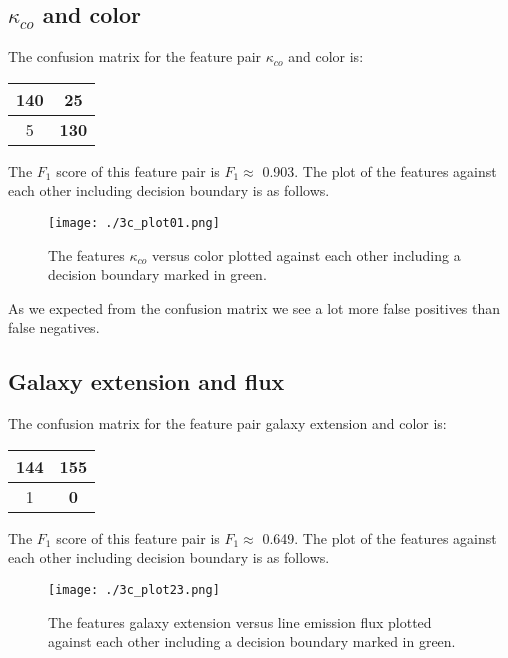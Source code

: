 \subsection*{$\kappa_{co}$ and color}

The confusion matrix for the feature pair $\kappa_{co}$ and color is:

\begin{table}[!h]
\centering
\begin{tabular}{c|c}
\textbf{140} & 25\\ \hline
5 &   \textbf{130}\\
\end{tabular}
\end{table}

The $F_1$ score of this feature pair is $F_1 \approx$ 0.903. The plot of the features against each other including decision boundary is as follows.\\

\begin{figure}[h!]
  \centering
  \texttt{[image: ./3c\_plot01.png]}
  \caption{The features $\kappa_{co}$ versus color plotted against each other including a decision boundary marked in green.}
\end{figure}

As we expected from the confusion matrix we see a lot more false positives than false negatives. 

\subsection*{Galaxy extension and flux}

The confusion matrix for the feature pair galaxy extension and color is:

\begin{table}[!h]
\centering
\begin{tabular}{c|c}
\textbf{144} & 155\\ \hline
1 &   \textbf{0}\\
\end{tabular}
\end{table}

The $F_1$ score of this feature pair is $F_1 \approx$ 0.649. The plot of the features against each other including decision boundary is as follows.\\

\begin{figure}[h!]
  \centering
  \texttt{[image: ./3c\_plot23.png]}
  \caption{The features galaxy extension versus line emission flux plotted against each other including a decision boundary marked in green.}
\end{figure}

